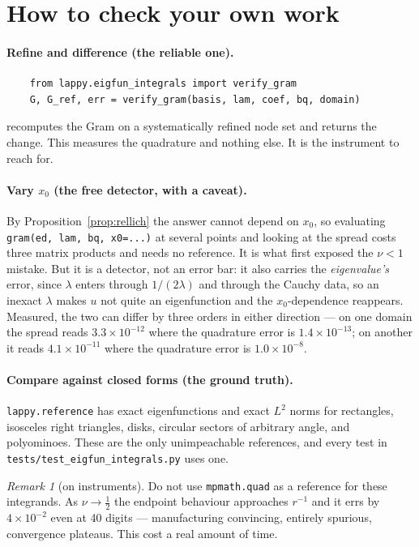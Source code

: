 \documentclass[11pt]{article}
\theoremstyle{definition}
\theoremstyle{remark}
\newtheorem{remark}{Remark}
\newcommand{\code}[1]{\texttt{#1}}
\begin{document}
\section{How to check your own work}\label{sec:instruments}

\paragraph{Refine and difference (the reliable one).}
\begin{verbatim}
    from lappy.eigfun_integrals import verify_gram
    G, G_ref, err = verify_gram(basis, lam, coef, bq, domain)
\end{verbatim}
recomputes the Gram on a systematically refined node set and returns the change.
This measures the quadrature and nothing else. It is the instrument to reach for.

\paragraph{Vary $x_0$ (the free detector, with a caveat).} By
Proposition~\ref{prop:rellich} the answer cannot depend on $x_0$, so evaluating
\code{gram(ed, lam, bq, x0=...)} at several points and looking at the spread
costs three matrix products and needs no reference. It is what first exposed the
$\nu<1$ mistake. But it is a detector, not an error bar: it also carries the
\emph{eigenvalue's} error, since $\lambda$ enters through $1/(2\lambda)$ and
through the Cauchy data, so an inexact $\lambda$ makes $u$ not quite an
eigenfunction and the $x_0$-dependence reappears. Measured, the two can differ by
three orders in either direction --- on one domain the spread reads
$3.3\times10^{-12}$ where the quadrature error is $1.4\times10^{-13}$; on another
it reads $4.1\times10^{-11}$ where the quadrature error is $1.0\times10^{-8}$.

\paragraph{Compare against closed forms (the ground truth).} \code{lappy.reference}
has exact eigenfunctions and exact $L^2$ norms for rectangles, isosceles right
triangles, disks, circular sectors of arbitrary angle, and polyominoes. These are
the only unimpeachable references, and every test in
\code{tests/test\_eigfun\_integrals.py} uses one.

\begin{remark}[on instruments]
Do not use \code{mpmath.quad} as a reference for these integrands. As
$\nu\to\tfrac12$ the endpoint behaviour approaches $r^{-1}$ and it errs by
$4\times10^{-2}$ even at 40 digits --- manufacturing convincing, entirely
spurious, convergence plateaus. This cost a real amount of time.
\end{remark}
\end{document}
